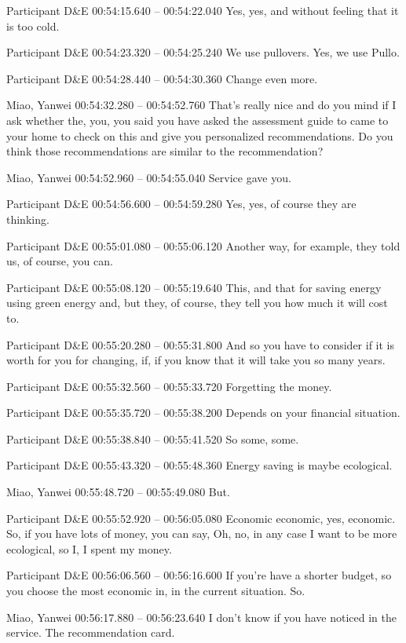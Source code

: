 {Participant D\&E 00:54:15.640 -- 00:54:22.040
Yes, yes, and without feeling that it is too cold.

Participant D\&E 00:54:23.320 -- 00:54:25.240
We use pullovers. Yes, we use Pullo.

Participant D\&E 00:54:28.440 -- 00:54:30.360
Change even more.

Miao, Yanwei 00:54:32.280 -- 00:54:52.760
That's really nice and do you mind if I ask whether the, you, you said you have asked the assessment guide to came to your home to check on this and give you personalized recommendations. Do you think those recommendations are similar to the recommendation?

Miao, Yanwei 00:54:52.960 -- 00:54:55.040
Service gave you.

Participant D\&E 00:54:56.600 -- 00:54:59.280
Yes, yes, of course they are thinking.

Participant D\&E 00:55:01.080 -- 00:55:06.120
Another way, for example, they told us, of course, you can.

Participant D\&E 00:55:08.120 -- 00:55:19.640
This, and that for saving energy using green energy and, but they, of course, they tell you how much it will cost to.

Participant D\&E 00:55:20.280 -- 00:55:31.800
And so you have to consider if it is worth for you for changing, if, if you know that it will take you so many years.

Participant D\&E 00:55:32.560 -- 00:55:33.720
Forgetting the money.

Participant D\&E 00:55:35.720 -- 00:55:38.200
Depends on your financial situation.

Participant D\&E 00:55:38.840 -- 00:55:41.520
So some, some.

Participant D\&E 00:55:43.320 -- 00:55:48.360
Energy saving is maybe ecological.

Miao, Yanwei 00:55:48.720 -- 00:55:49.080
But.

Participant D\&E 00:55:52.920 -- 00:56:05.080
Economic economic, yes, economic. So, if you have lots of money, you can say, Oh, no, in any case I want to be more ecological, so I, I spent my money.

Participant D\&E 00:56:06.560 -- 00:56:16.600
If you're have a shorter budget, so you choose the most economic in, in the current situation. So.

Miao, Yanwei 00:56:17.880 -- 00:56:23.640
I don't know if you have noticed in the service. The recommendation card.

}
